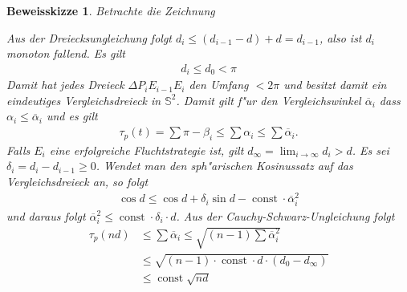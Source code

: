 \documentclass[paper=A4, twoside, chapterprefix=true, bibliography=totoc, headsepline]{scrbook}
\newcommand{\tikzgitter}[3][0.25]{ %
	\draw[step=#1,gray!15] #2 grid #3;
	\draw[step=2*#1,gray!30] #2 grid #3;
	\fill (0,0) circle(0.1); 
}
\renewcommand{\S}{\mathbb{S}}
\DeclareMathOperator{\const}{const} %
\theoremstyle{break}
\theoremstyle{nonumberbreak}
\newtheorem{bewSkiz}{Beweisskizze}
\theoremstyle{emptybreak}
\theoremstyle{break}
\begin{document}
\begin{bewSkiz}
Betrachte die Zeichnung
\begin{center}\end{center}
Aus der Dreiecksungleichung folgt $d_i \le (d_{i-1} - d) + d = d_{i-1}$, also ist $d_i$ monoton fallend.
Es gilt
\begin{align*}
	d_i \le d_0 < \pi
\end{align*}
Damit hat jedes Dreieck $\Delta P_iE_{i-1}E_i$ den Umfang $<2\pi$ und besitzt damit ein eindeutiges Vergleichsdreieck in $\S^2$.
Damit gilt f"ur den Vergleichswinkel $\overline\alpha_i$ dass $\alpha_i \le \overline\alpha_i$ und es gilt
\begin{align*}
	\tau_p(t) = \sum \pi - \beta_i \le \sum \alpha_i \le \sum \overline\alpha_i.
\end{align*}
Falls $E_i$ eine erfolgreiche Fluchtstrategie ist, gilt $d_\infty = \lim_{i \to \infty} d_i > d$.
Es sei $\delta_i = d_i - d_{i-1} \ge 0$.
Wendet man den sph"arischen Kosinussatz auf das Vergleichsdreieck an, so folgt
\begin{align*}
	\cos d \le \cos d + \delta_i \sin d - \const \cdot \overline\alpha_i^2
\end{align*}
und daraus folgt $\overline\alpha_i^2 \le \const \cdot \delta_i \cdot d$.
Aus der Cauchy-Schwarz-Ungleichung folgt
\begin{align*}
	\tau_p(nd) &\le \sum \overline\alpha_i \le \sqrt{(n-1) \sum \overline\alpha_i^2} \\
	&\le \sqrt{(n-1) \cdot \const \cdot d \cdot (d_0 - d_\infty)} \\
	&\le \const \sqrt{nd}
\end{align*}
\end{bewSkiz}
\end{document}
